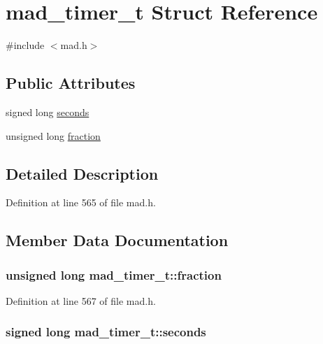 \hypertarget{structmad__timer__t}{}\section{mad\+\_\+timer\+\_\+t Struct Reference}
\label{structmad__timer__t}


{\ttfamily \#include $<$mad.\+h$>$}

\subsection*{Public Attributes}
\begin{DoxyCompactItemize}
\item 
signed long \hyperlink{structmad__timer__t_a8512befd035c37461be6d8eb094ea76a}{seconds}
\item 
unsigned long \hyperlink{structmad__timer__t_a570ebe6a48b525b3f8f9997678dbb782}{fraction}
\end{DoxyCompactItemize}


\subsection{Detailed Description}


Definition at line 565 of file mad.\+h.



\subsection{Member Data Documentation}
\subsubsection[{\texorpdfstring{fraction}{fraction}}]{\setlength{\rightskip}{0pt plus 5cm}unsigned long mad\+\_\+timer\+\_\+t\+::fraction}\hypertarget{structmad__timer__t_a570ebe6a48b525b3f8f9997678dbb782}{}\label{structmad__timer__t_a570ebe6a48b525b3f8f9997678dbb782}


Definition at line 567 of file mad.\+h.

\subsubsection[{\texorpdfstring{seconds}{seconds}}]{\setlength{\rightskip}{0pt plus 5cm}signed long mad\+\_\+timer\+\_\+t\+::seconds}\hypertarget{structmad__timer__t_a8512befd035c37461be6d8eb094ea76a}{}\label{structmad__timer__t_a8512befd035c37461be6d8eb094ea76a}


